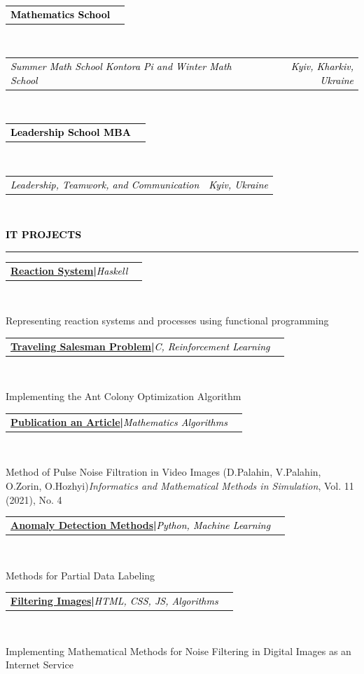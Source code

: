 \documentclass[10pt,english,french]{article}
\makeatletter
\newcommand{\itProjectIcon}[1][black]{\textcolor{#1}{\faLaptopCode}}
\newlength{\mpwidth}
\newcommand{\cvsection}[1]{
    \vspace{5pt}
    \textbf{\fontsize{12pt}{10pt}\selectfont \textcolor{black}{#1}}
    \vspace{8pt}
    \hrule
    \vspace{8pt}
}
\newcommand{\cvevent}[2]{
    \vspace{2pt}
    \parbox{\mpwidth}{
        \begin{tabular*}{1\mpwidth}{@{\extracolsep{\fill}} l r}
            \textcolor{black}{\textbf{\fontsize{11}{12}\selectfont #1}} & \textcolor{black}{\textbf{\fontsize{12}{12}\selectfont #2}} \\
        \end{tabular*}\\[-8pt] %
    }
}
\newcommand{\cveventitproject}[3]{
    \vspace{2pt}
    \parbox{\mpwidth}{
        \begin{tabular*}{\mpwidth}{@{\extracolsep{\fill}} l r}
            \textcolor{black}{\textbf{\fontsize{11}{12}\selectfont #1}}\hspace{-5pt}\textbf{\textcolor{black}{\quad|\quad}}\hspace{-5pt}\textcolor{black}{\textit{\fontsize{11}{12}\selectfont #2}} & 
            \textcolor{black}{\textbf{\fontsize{12}{12}\selectfont #3}} \\
        \end{tabular*}\\[-8pt] %
    }
}
\newcommand{\cvsubevent}[2]{
    \parbox{\mpwidth}{
        \begin{tabular*}{1\mpwidth}{@{\extracolsep{\fill}} l r}
            \textcolor{black}{\textit{\fontsize{10}{12}\selectfont #1}} & \textcolor{black}{\textit{\fontsize{10}{12}\selectfont #2}} \\
        \end{tabular*}\\[-8pt] %
    }
    \vspace{-10pt}
}
\makeatother
\begin{document}
\vspace{-12pt}
\cvevent{Mathematics School}{2019}
\cvsubevent{Summer Math School Kontora Pi and Winter Math School}{Kyiv, Kharkiv, Ukraine}

\cvevent{Leadership School MBA}{2018}
\cvsubevent{Leadership, Teamwork, and Communication}{Kyiv, Ukraine}

\vspace{-1pt}
\cvsection{\itProjectIcon[black]\hspace{4pt}IT PROJECTS}

\vspace{-4pt}
\cveventitproject{\href{https://github.com/DmytroPalahin/hsReact}{Reaction System}}{Haskell}{2024}
{Representing reaction systems and processes using functional programming}

\vspace{3pt}
\cveventitproject{\href{https://github.com/DmytroPalahin/Probleme_du_Voyageur_de_Commerce}{Traveling Salesman Problem}}{C, Reinforcement Learning}{2023}
{Implementing the Ant Colony Optimization Algorithm}

\vspace{3pt}
\cveventitproject{\href{https://www.researchsquare.com/article/rs-2203260/v1}{Publication an Article}}{Mathematics Algorithms}{2021}
{Method of Pulse Noise Filtration in Video Images (D.Palahin, V.Palahin, O.Zorin, O.Hozhyi)\newline\textit{Informatics and Mathematical Methods in Simulation}, Vol. 11 (2021), No. 4}

\vspace{3pt}
\cveventitproject{\href{https://github.com/DmytroPalahin/Anomaly_Detection}{Anomaly Detection Methods}}{Python, Machine Learning}{2020}
{Methods for Partial Data Labeling}

\vspace{3pt}
\cveventitproject{\href{https://github.com/DmytroPalahin/Filtering_Images}{Filtering Images}}{HTML, CSS, JS, Algorithms}{2019}
{Implementing Mathematical Methods for Noise Filtering in Digital Images as an Internet Service}
\end{document}
